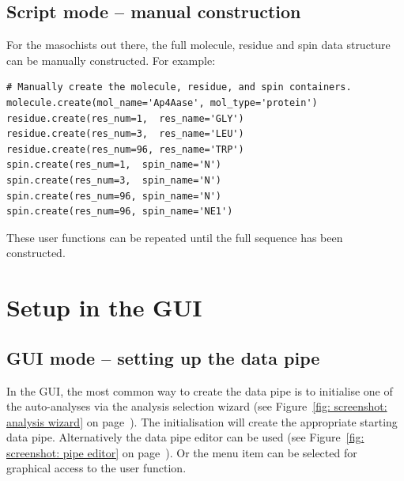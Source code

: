 \subsection{Script mode -- manual construction} \label{sect: script - manual construction}

For the masochists out there, the full molecule, residue and spin data structure can be manually constructed.
For example:

\begin{lstlisting}
# Manually create the molecule, residue, and spin containers.
molecule.create(mol_name='Ap4Aase', mol_type='protein')
residue.create(res_num=1,  res_name='GLY')
residue.create(res_num=3,  res_name='LEU')
residue.create(res_num=96, res_name='TRP')
spin.create(res_num=1,  spin_name='N')
spin.create(res_num=3,  spin_name='N')
spin.create(res_num=96, spin_name='N')
spin.create(res_num=96, spin_name='NE1')
\end{lstlisting}

These user functions can be repeated until the full sequence has been constructed.




\section{Setup in the GUI}



\subsection{GUI mode -- setting up the data pipe} \label{sect: GUI - data pipe}

In the GUI, the most common way to create the data pipe is to initialise one of the auto-analyses via the analysis selection wizard (see Figure~\ref{fig: screenshot: analysis wizard} on page~\pageref{fig: screenshot: analysis wizard}).
The initialisation will create the appropriate starting data pipe.
Alternatively the data pipe editor can be used (see Figure~\ref{fig: screenshot: pipe editor} on page~\pageref{fig: screenshot: pipe editor}).
Or the  menu item can be selected for graphical access to the  user function.




